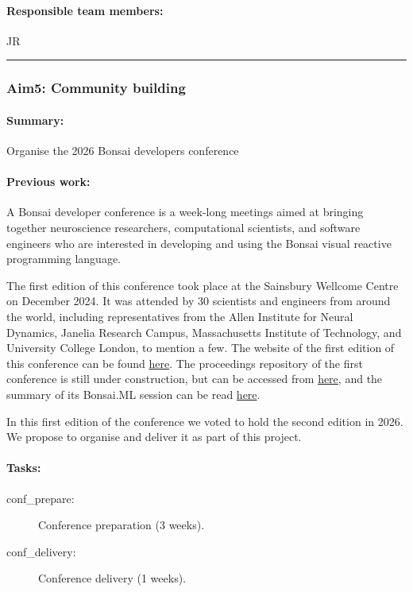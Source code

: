 \paragraph{Responsible team members:} JR

\noindent\rule{\textwidth}{1pt}
\subsubsection{Aim5: Community building}
\paragraph{Summary:} Organise the 2026 Bonsai developers conference

\paragraph{Previous work:} A Bonsai developer conference is a week-long
meetings aimed at bringing together neuroscience researchers, computational
scientists, and software engineers who are interested in developing and using
the Bonsai visual reactive programming language.

The first edition of this conference took place at the Sainsbury Wellcome
Centre on December 2024. It was attended by 30 scientists and engineers from
around the world, including representatives from the Allen Institute for Neural
Dynamics, Janelia Research Campus, Massachusetts Institute of Technology, and
University College London, to mention a few.
%
The website of the first edition of this conference  can be found
\href{https://conference.bonsai-rx.org/2024/}{here}.  The proceedings
repository of the first conference is still under construction, but can be
accessed from
\href{https://github.com/joacorapela/bonsaiConference2024Proceedings}{here},
and the summary of its Bonsai.ML session can be read
\href{https://github.com/joacorapela/bonsaiConference2024Proceedings/blob/master/sessions/machineLearning/README.md}{here}.

In this first edition of the conference we voted to hold the second edition in
2026. We propose to organise and deliver it as part of this project.

\paragraph{Tasks:}

\begin{description}

    \item[conf\_prepare:] Conference preparation (3 weeks).
    \item[conf\_delivery:] Conference delivery (1 weeks).

\end{description}


